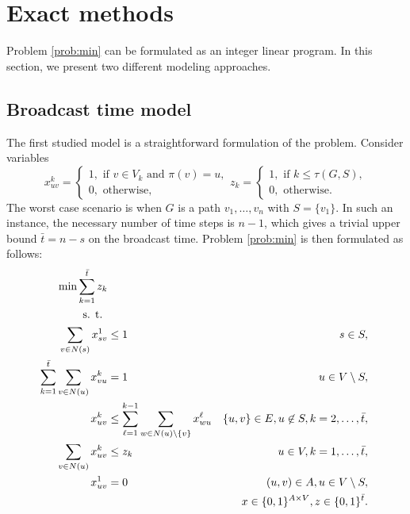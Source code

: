 \section{Exact methods}

Problem \ref{prob:min} can be formulated as an integer linear program. %
In this section, we present two different modeling approaches. 

\subsection{Broadcast time model}
The first studied model is a straightforward formulation of the problem.
Consider variables 
$$ x_{uv}^k=
\begin{cases} 
1, \text{ if } v\in V_k \text{ and } \pi(v)=u,\\ 
0, \text{ otherwise},
\end{cases}
z_{k}=\begin{cases}
1, \text{ if } k\leq\tau(G,S),\\
0, \text{ otherwise}.
\end{cases}
$$
The worst case scenario is when $G$ is a path $v_1,\dots,v_n$ with $S=\{v_1\}$. 
In such an instance, the necessary number of time steps is $n-1$, which gives a trivial upper bound $\bar{t}=n-s$ on the broadcast time.
Problem \ref{prob:min} is then formulated as follows: 
\begin{subequations}\label{mod:basic}
\begin{align}
\label{mod:basic:obj} \min \sum\limits_{k=1}^{\bar{t}}z_k \\ 
\notag \text{s. t. } \\
\label{mod:basic:onefromroot} \sum_{v \in N(s)}x^1_{sv} & \leq 1 & s\in S,\\
\label{mod:basic:singlein} \sum\limits_{k=1}^{\bar{t}}\sum\limits_{v\in N(u)}x_{vu}^k & = 1 & u\in V \setminus S,\\
\label{mod:basic:tIncreases} x_{uv}^k &\leq\sum\limits_{\ell=1}^{k-1}\sum\limits_{w\in N(u)\setminus\{v\}} x_{wu}^{\ell}  & \{u,v\}\in E, u\not\in S, k=2,\dots,\bar{t},\\
\label{mod:basic:tcrel} \sum\limits_{v\in N(u)}x_{uv}^k & \leq z_k &  u\in V,k=1,\dots,\bar{t},\\
\label{mod:basic:positiveCost}x_{uv}^1 & = 0 & (u,v)\in A, u \in V\setminus S,\\
\label{mod:basic:dim}&&x \in \{0,1\}^{A\times V},z\in\{0,1\}^{\bar{t}}.
\end{align}~
\end{subequations}
